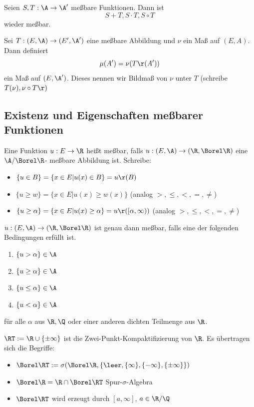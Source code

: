 \documentclass[11pt, a4paper]{article}
\def\SigAlg{$\sigma$-Algebra }
\begin{document}
\begin{corollary}
    Seien $S,T: \A \to \A'$ meßbare Funktionen. Dann ist
    $$S+T, S\cdot T, S\circ T$$
    wieder meßbar. 
\end{corollary}

\begin{theorem}  Sei $T:(E,\A) \to (E',\A')$ eine meßbare Abbildung und $\nu$ ein Maß auf $(E,A)$. Dann definiert 
$$\mu(A') = \nu(T\r(A'))$$
ein Maß auf $(E,\A')$. Dieses nennen wir Bildmaß von $\nu$ unter $T$ (schreibe $T(\nu), \nu \circ T\r )$

\end{theorem}


\subsection{Existenz und Eigenschaften meßbarer Funktionen}
\begin{definition}
    Eine Funktion $u: E\to \R$ heißt meßbar, falls $u:(E,\A) \to (\R, \Borel \R)$ eine $\A / \Borel \R $- meßbare Abbildung ist. Schreibe:
    \begin{itemize}[label = -]
        \item $\{u\in B\} = \{x\in E| u(x)\in B\} = u\r(B)$
        \item $\{u\geq w\} = \{x\in E| u(x)\geq w(x)\}$ (analog $>,\leq,<,=,\neq$)
        \item $\{u\geq \alpha\} = \{x\in E| u(x)\geq \alpha\} = u\r([\alpha, \infty))$ (analog $>,\leq,<,=,\neq$)
    \end{itemize}
\end{definition}

\begin{lemma} 
$u: (E,\A)\to (\R, \Borel \R)$ ist genau dann meßbar, falls eine der folgenden Bedingungen erfüllt ist.
\begin{enumerate}
    \item $\{u> \alpha\}\in \A$
    \item $\{u\geq \alpha\}\in \A$
    \item $\{u\leq \alpha\}\in \A$
    \item $\{u< \alpha\}\in \A$
\end{enumerate}
für alle $\alpha$ aus $\R, \Q$ oder einer anderen dichten Teilmenge aus $\R$.
\end{lemma}

\begin{definition}
    $\RT:=\R \cup \{\pm \infty\}$ ist die Zwei-Punkt-Kompaktifizierung von $\R$. Es übertragen sich die Begriffe:
    \begin{itemize}[label=-]
        \item $\Borel \RT := \sigma(\Borel \R, \{ \leer,\{\infty\},\{-\infty\},\{\pm\infty\}\})$
        \item $\Borel \R = \R \cap \Borel \RT$ Spur-\SigAlg
        \item $\Borel \RT$ wird erzeugt durch $[a,\infty]$, $a\in \R / \Q$
    \end{itemize}
\end{definition}
\end{document}

